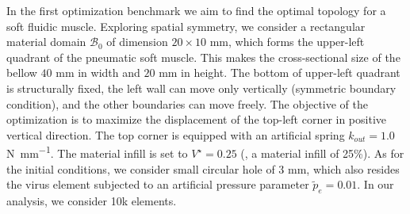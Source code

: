 In the first optimization benchmark we aim to find the optimal topology for a soft fluidic muscle. Exploring spatial symmetry, we consider a rectangular material domain $\mathcal{B}_0$ of dimension $20 \times 10$ \si{\milli \meter}, which forms the upper-left quadrant of the pneumatic soft muscle. This makes the cross-sectional size of the bellow $40$ \si{\milli \meter} in width and $20$ \si{\milli \meter} in height. The bottom of upper-left quadrant is structurally fixed, the left wall can move only vertically (symmetric boundary condition), and the other boundaries can move freely. The objective of the optimization is to maximize the displacement of the top-left corner in positive vertical direction. The top corner is equipped with an artificial spring $k_{out} = 1.0$ \si{\newton \per \milli \meter}. The material infill is set to $V^\star = 0.25$ (\ie, a material infill of 25\%). As for the initial conditions, we consider small circular hole of $3$ \si{\milli \meter}, which also resides the virus element subjected to an artificial pressure parameter $\tilde{p}_e = 0.01$. In our analysis, we consider 10k elements.
%

